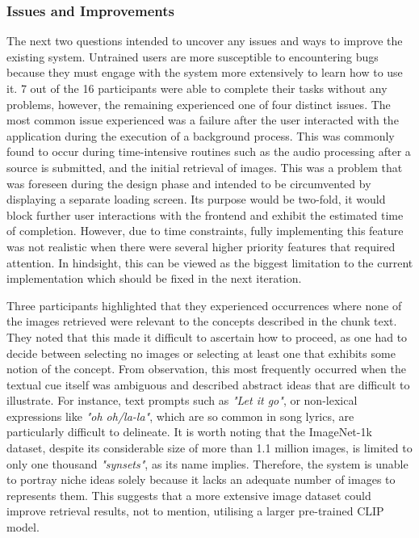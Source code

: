 \documentclass{l4proj}
\begin{document}
\subsubsection{Issues and Improvements}
The next two questions intended to uncover any issues and ways to improve the existing system. Untrained users are more susceptible to encountering bugs because they must engage with the system more extensively to learn how to use it. 7 out of the 16 participants were able to complete their tasks without any problems, however, the remaining experienced one of four distinct issues. The most common issue experienced was a failure after the user interacted with the application during the execution of a background process. This was commonly found to occur during time-intensive routines such as the audio processing after a source is submitted, and the initial retrieval of images. This was a problem that was foreseen during the design phase and intended to be circumvented by displaying a separate loading screen. Its purpose would be two-fold, it would block further user interactions with the frontend and exhibit the estimated time of completion. However, due to time constraints, fully implementing this feature was not realistic when there were several higher priority features that required attention. In hindsight, this can be viewed as the biggest limitation to the current implementation which should be fixed in the next iteration.

Three participants highlighted that they experienced occurrences where none of the images retrieved were relevant to the concepts described in the chunk text. They noted that this made it difficult to ascertain how to proceed, as one had to decide between selecting no images or selecting at least one that exhibits some notion of the concept. From observation, this most frequently occurred when the textual cue itself was ambiguous and described abstract ideas that are difficult to illustrate. For instance, text prompts such as \emph{"Let it go"}, or non-lexical expressions like \emph{"oh oh/la-la"}, which are so common in song lyrics, are particularly difficult to delineate. It is worth noting that the ImageNet-1k dataset, despite its considerable size of more than 1.1 million images, is limited to only one thousand \emph{"synsets"}, as its name implies. Therefore, the system is unable to portray niche ideas solely because it lacks an adequate number of images to represents them. This suggests that a more extensive image dataset could improve retrieval results, not to mention, utilising a larger pre-trained CLIP model.
\end{document}
